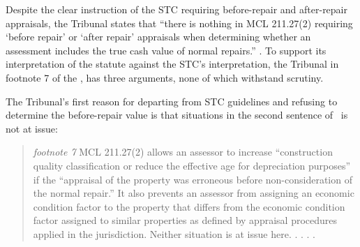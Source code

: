 \documentclass[12pt,\documentclassflag]{michiganCourtOfAppealsBrief}
\begin{document}

Despite the clear instruction of the STC requiring before-repair and after-repair appraisals, the Tribunal states that ``there is nothing in MCL 211.27(2) requiring `before repair' or `after repair' appraisals when determining whether an assessment includes the true cash value of normal repairs.'' \reconsiderationDenied[2]. To support its interpretation of the statute against the STC's interpretation,  the Tribunal in footnote 7 of the \reconsiderationDenied[2], has three arguments, none of which withstand scrutiny.

The Tribunal's first reason for departing from STC guidelines and refusing to determine the before-repair value is that situations in the second sentence of \mathieuGast\ is not at issue:

\begin{quote}
  {\em footnote 7} MCL 211.27(2) allows an assessor to increase ``construction quality classification or reduce the effective age for depreciation purposes'' if the ``appraisal of the property was erroneous before non-consideration of the normal repair.'' It also prevents an assessor from assigning an economic condition factor to the property that differs from the economic condition factor assigned to similar properties as defined by appraisal procedures applied in the jurisdiction. Neither situation is at issue here. . . . \reconsiderationDenied[2].
\end{quote}
\end{document}
